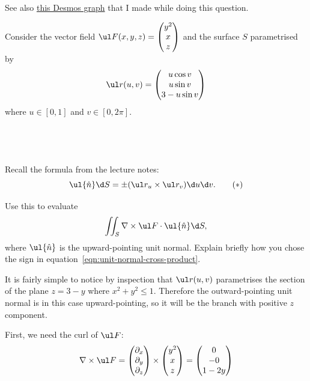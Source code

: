 \documentclass[a4paper]{article}
\begin{document}
See also \href{https://www.desmos.com/calculator/lt9gbsamu1}{this Desmos graph} that I made while doing this question.



\begin{questionbody}
Consider the vector field $\ul F(x, y, z) = \begin{pmatrix} y^2 \\ x \\ z \end{pmatrix}$ and the surface $S$ parametrised by \[
\ul r(u,v) = \begin{pmatrix} u \cos v \\ u \sin v \\ 3 - u \sin v \end{pmatrix}
\] where $u \in [0,1]$ and $v \in [0, 2\pi]$.
\end{questionbody}

\subsection{~} %

\begin{questionbody}
Recall the formula from the lecture notes: \begin{equation*}
\ul{\hat n} \d S = \pm (\ul r_u \times \ul r_v) \d u \d v .
\tag{$*$}
\label{eqn:unit-normal-cross-product}
\end{equation*}

Use this to evaluate \[
\iint_S \nabla \times \ul F \cdot \ul{\hat n} \d S ,
\] where $\ul{\hat n}$ is the upward-pointing unit normal. Explain briefly how you chose the sign in equation~\eqref{eqn:unit-normal-cross-product}.
\end{questionbody}

It is fairly simple to notice by inspection that $\ul r(u, v)$ parametrises the section of the plane $z = 3-y$ where $x^2 + y^2 \le 1$. Therefore the outward-pointing unit normal is in this case upward-pointing, so it will be the branch with positive $z$ component.

First, we need the curl of $\ul F$: $$\nabla \times \ul F = \begin{pmatrix} \partial_x \\ \partial_y \\ \partial_z \end{pmatrix} \times \begin{pmatrix} y^2 \\ x \\ z \end{pmatrix} = \begin{pmatrix} 0 \\ -0 \\ 1 - 2y \end{pmatrix}$$
\end{document}
